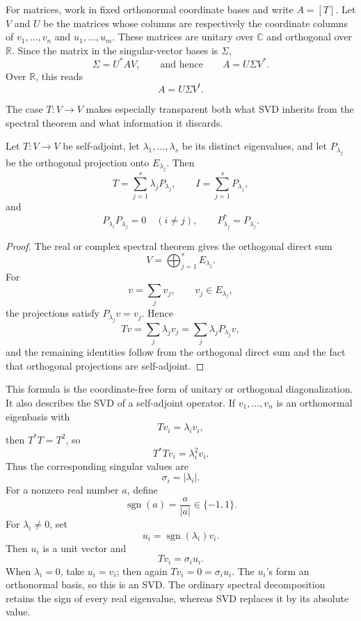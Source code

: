 For matrices, work in fixed orthonormal coordinate bases and write \(A=[T]\).
Let \(V\) and \(U\) be the matrices whose
columns are respectively the coordinate columns of \(v_1,\ldots,v_n\) and
\(u_1,\ldots,u_m\).  These matrices are unitary over \(\mathbb C\) and
orthogonal over \(\mathbb R\).  Since the matrix in the singular-vector
bases is \(\Sigma\),
\[
\Sigma=U^*AV,
\qquad\text{and hence}\qquad
A=U\Sigma V^*.
\]
Over \(\mathbb R\), this reads
\[
A=U\Sigma V^t.
\]


The case \(T:V\to V\) makes especially transparent both what SVD inherits
from the spectral theorem and what information it discards.

\begin{proposition}
Let \(T:V\to V\) be self-adjoint, let
\(\lambda_1,\ldots,\lambda_s\) be its distinct eigenvalues, and let
\(P_{\lambda_j}\) be the orthogonal projection onto
\(E_{\lambda_j}\).  Then
\[
T=\sum_{j=1}^s\lambda_jP_{\lambda_j},
\qquad
I=\sum_{j=1}^sP_{\lambda_j},
\]
and
\[
P_{\lambda_i}P_{\lambda_j}=0\quad(i\ne j),
\qquad
P_{\lambda_j}^*=P_{\lambda_j}.
\]
\end{proposition}
\begin{proof}
The real or complex spectral theorem gives the orthogonal direct sum
\[
V=\bigoplus_{j=1}^sE_{\lambda_j}.
\]
For
\[
v=\sum_jv_j,
\qquad v_j\in E_{\lambda_j},
\]
the projections satisfy \(P_{\lambda_j}v=v_j\). Hence
\[
Tv=\sum_j\lambda_jv_j
=\sum_j\lambda_jP_{\lambda_j}v,
\]
and the remaining identities follow from the orthogonal direct sum and the
fact that orthogonal projections are self-adjoint.
\end{proof}

This formula is the coordinate-free form of unitary or orthogonal
diagonalization.  It also describes the SVD of a self-adjoint operator.  If
\(v_1,\ldots,v_n\) is an orthonormal eigenbasis with
\[
Tv_i=\lambda_iv_i,
\]
then \(T^*T=T^2\), so
\[
T^*Tv_i=\lambda_i^2v_i.
\]
Thus the corresponding singular values are
\[
\sigma_i=|\lambda_i|.
\]
For a nonzero real number \(a\), define
\[
\operatorname{sgn}(a)=\frac{a}{|a|}\in\{-1,1\}.
\]
For \(\lambda_i\ne0\), set
\[
u_i=\operatorname{sgn}(\lambda_i)v_i.
\]
Then \(u_i\) is a unit vector and
\[
Tv_i=\sigma_i u_i.
\]
When \(\lambda_i=0\), take \(u_i=v_i\); then again
\(Tv_i=0=\sigma_i u_i\).  The \(u_i\)'s form an orthonormal basis, so this
is an SVD.  The ordinary spectral decomposition retains the sign of every
real eigenvalue, whereas SVD replaces it by its absolute value.

